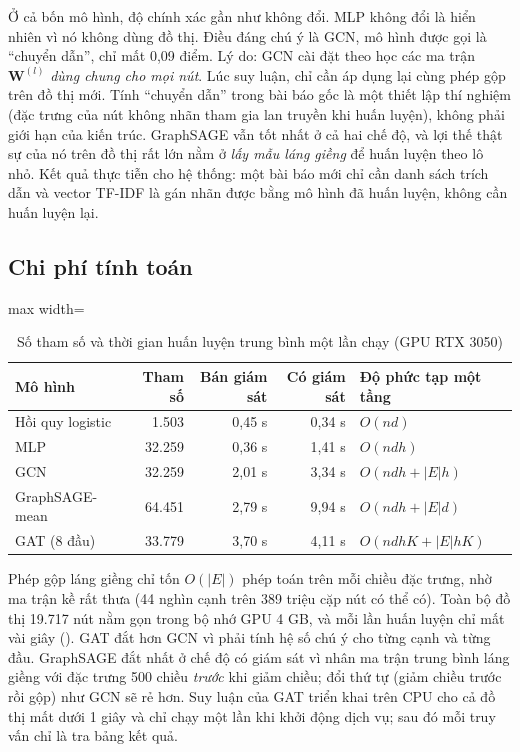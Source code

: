 Ở cả bốn mô hình, độ chính xác gần như không đổi. MLP không đổi là hiển nhiên vì nó không dùng đồ thị. Điều đáng chú ý là GCN, mô hình được gọi là ``chuyển dẫn'', chỉ mất 0,09 điểm. Lý do: GCN cài đặt theo  học các ma trận $\mathbf W^{(l)}$ \emph{dùng chung cho mọi nút}. Lúc suy luận, chỉ cần áp dụng lại cùng phép gộp trên đồ thị mới. Tính ``chuyển dẫn'' trong bài báo gốc là một thiết lập thí nghiệm (đặc trưng của nút không nhãn tham gia lan truyền khi huấn luyện), không phải giới hạn của kiến trúc. GraphSAGE vẫn tốt nhất ở cả hai chế độ, và lợi thế thật sự của nó trên đồ thị rất lớn nằm ở \emph{lấy mẫu láng giềng} để huấn luyện theo lô nhỏ. Kết quả thực tiễn cho hệ thống: một bài báo mới chỉ cần danh sách trích dẫn và vector TF-IDF là gán nhãn được bằng mô hình đã huấn luyện, không cần huấn luyện lại.

\subsection{Chi phí tính toán}

\begin{table}[H]
\centering
\caption{Số tham số và thời gian huấn luyện trung bình một lần chạy (GPU RTX 3050)}
\label{tab:ch6-cost}
\small
\begin{adjustbox}{max width=\linewidth}
\begin{tabular}{@{}lrrrl@{}}
\toprule
\textbf{Mô hình} & \textbf{Tham số} & \textbf{Bán giám sát} & \textbf{Có giám sát} & \textbf{Độ phức tạp một tầng} \\
\midrule
Hồi quy logistic & 1.503 & 0,45 s & 0,34 s & $O(nd)$ \\
MLP & 32.259 & 0,36 s & 1,41 s & $O(ndh)$ \\
GCN & 32.259 & 2,01 s & 3,34 s & $O(ndh + |E|h)$ \\
GraphSAGE-mean & 64.451 & 2,79 s & 9,94 s & $O(ndh + |E|d)$ \\
GAT (8 đầu) & 33.779 & 3,70 s & 4,11 s & $O(ndhK + |E|hK)$ \\
\bottomrule
\end{tabular}
\end{adjustbox}
\end{table}

Phép gộp láng giềng chỉ tốn $O(|E|)$ phép toán trên mỗi chiều đặc trưng, nhờ ma trận kề rất thưa (44 nghìn cạnh trên 389 triệu cặp nút có thể có). Toàn bộ đồ thị 19.717 nút nằm gọn trong bộ nhớ GPU 4 GB, và mỗi lần huấn luyện chỉ mất vài giây (). GAT đắt hơn GCN vì phải tính hệ số chú ý cho từng cạnh và từng đầu. GraphSAGE đắt nhất ở chế độ có giám sát vì nhân ma trận trung bình láng giềng với đặc trưng 500 chiều \emph{trước} khi giảm chiều; đổi thứ tự (giảm chiều trước rồi gộp) như GCN sẽ rẻ hơn. Suy luận của GAT triển khai trên CPU cho cả đồ thị mất dưới 1 giây và chỉ chạy một lần khi khởi động dịch vụ; sau đó mỗi truy vấn chỉ là tra bảng kết quả.


